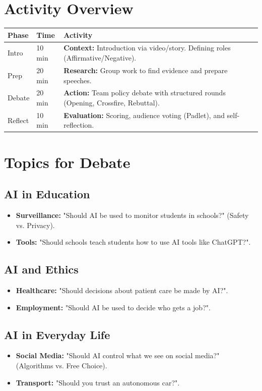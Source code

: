 \documentclass[11pt, a4paper]{article}
\begin{document}
\section*{Activity Overview}
\begingroup
\small
\begin{tabularx}{\textwidth}{|l|l|L|}
    \hline
     \textbf{Phase} & \textbf{Time} & \textbf{Activity} \\ \hline
    Intro & 10 min & \textbf{Context:} Introduction via video/story. Defining roles (Affirmative/Negative). \\ \hline
    Prep & 20 min & \textbf{Research:} Group work to find evidence and prepare speeches. \\ \hline
    Debate & 20 min & \textbf{Action:} Team policy debate with structured rounds (Opening, Crossfire, Rebuttal). \\ \hline
    Reflect & 10 min & \textbf{Evaluation:} Scoring, audience voting (Padlet), and self-reflection. \\ \hline
\end{tabularx}
\endgroup

\section{Topics for Debate}
\subsection{AI in Education}
\begin{itemize}
    \item \textbf{Surveillance:} "Should AI be used to monitor students in schools?" (Safety vs. Privacy).
    \item \textbf{Tools:} "Should schools teach students how to use AI tools like ChatGPT?".
\end{itemize}

\subsection{AI and Ethics}
\begin{itemize}
    \item \textbf{Healthcare:} "Should decisions about patient care be made by AI?".
    \item \textbf{Employment:} "Should AI be used to decide who gets a job?".
\end{itemize}

\subsection{AI in Everyday Life}
\begin{itemize}
    \item \textbf{Social Media:} "Should AI control what we see on social media?" (Algorithms vs. Free Choice).
    \item \textbf{Transport:} "Should you trust an autonomous car?".
\end{itemize}
\end{document}
